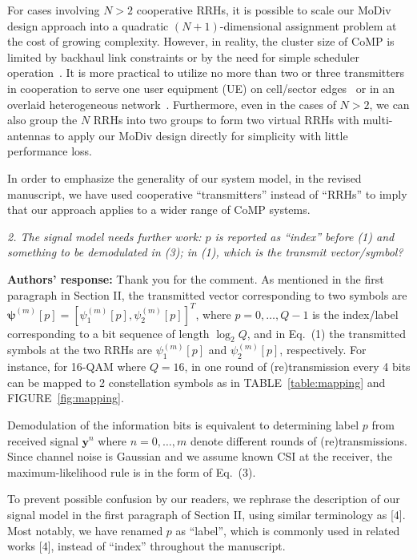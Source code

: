 \documentclass[onecolumn, 11pt, draftclsnofoot]{IEEEtran}
\begin{document}
For cases involving $N>2$ cooperative RRHs, it is possible to
scale our MoDiv design approach into a quadratic $(N+1)$-dimensional
assignment problem at the cost of growing complexity. However, in reality,
the cluster size of CoMP is limited by backhaul link constraints or by the need for 
simple scheduler operation~\citep[R][]{6146494}. It is more
practical to utilize no more than two or three transmitters in cooperation
to serve one user equipment (UE) on cell/sector
edges~\citep[R][]{4385782, 5463229, 5456455} or in an overlaid heterogeneous
network~\citep[R][]{6879305, 6362916}. Furthermore, even in the cases of $N>2$, 
we can also group the $N$ RRHs into two groups to form two virtual RRHs with
multi-antennas to apply our MoDiv design directly for simplicity with little performance loss. 

In order to emphasize the generality of our system model, in the revised
manuscript, we have used cooperative ``transmitters'' instead of ``RRHs'' to
imply that our approach applies to a wider range of CoMP systems.

\vspace{0.5cm}

\noindent
\emph{2. The signal model needs further work: $p$ is reported as “index” before
(1) and something to be demodulated in (3); in (1), which is the transmit
vector/symbol? }

\noindent \textbf{Authors' response:}
Thank you for the comment. As mentioned in the first paragraph in Section
II, the transmitted vector corresponding to two symbols are
$\bm{\psi}^{(m)}[p] = [\psi_1^{(m)}[p], \psi_2^{(m)}[p]]^T$, where
$p=0,\ldots,Q-1$ is the index/label corresponding to a bit sequence of length
$\log_2Q$, and in Eq.~(1) the transmitted symbols at the two RRHs are
$\psi_1^{(m)}[p]$ and $\psi_2^{(m)}[p]$, respectively. For instance, for 16-QAM where $Q=16$, in
one round of (re)transmission every 4 bits can be mapped to 2 constellation
symbols as in TABLE~\ref{table:mapping} and FIGURE~\ref{fig:mapping}.

Demodulation of the information bits is equivalent to determining label $p$ from
received signal $\mathbf{y}^{n}$ where $n=0,\ldots,m$ denote different
rounds of (re)transmissions. Since channel noise is Gaussian and we
assume known CSI at the receiver, the maximum-likelihood rule is in the form
of Eq.~(3).

To prevent possible confusion by our readers, we rephrase the description of
our signal model in the first paragraph of Section II, using similar
terminology as [4]. Most notably, we have renamed $p$ as ``label'', which is
commonly used in related works [4]\citep[R][]{1388738, 7494668}, instead of
``index'' throughout the manuscript.
\end{document}
